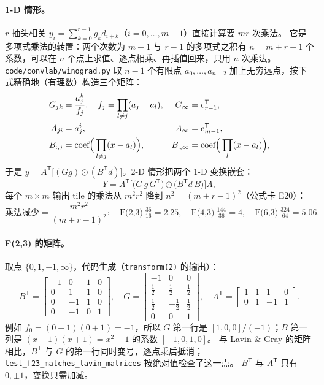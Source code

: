 \documentclass[11pt,a4paper]{ctexart}
\begin{document}
\paragraph{1-D 情形。} $r$ 抽头相关 $y_i = \sum_{k=0}^{r-1} g_k d_{i+k}$（$i = 0,\dots,m-1$）直接计算要 $mr$ 次乘法。
它是多项式乘法的转置：两个次数为 $m-1$ 与 $r-1$ 的多项式之积有 $n = m+r-1$ 个系数，可以在 $n$ 个点上求值、逐点相乘、再插值回来，只用 $n$ 次乘法。
\texttt{code/convlab/winograd.py} 取 $n-1$ 个有限点 $a_0,\dots,a_{n-2}$ 加上无穷远点，按下式精确地（有理数）构造三个矩阵：
\begin{align}
  G_{jk} &= \frac{a_j^k}{f_j},\quad f_j = \prod_{l\neq j}(a_j-a_l), & G_{\infty} &= e_{r-1}^{\mathsf T}, \notag\\
  A_{ji} &= a_j^i, & A_{\infty} &= e_{m-1}^{\mathsf T}, \label{eq:toomcook}\\
  B_{:,j} &= \text{coef}\Big(\prod_{l\neq j}(x-a_l)\Big), & B_{:,\infty} &= \text{coef}\Big(\prod_{l}(x-a_l)\Big), \notag
\end{align}
于是 $y = A^{\mathsf T}\big[(Gg)\odot(B^{\mathsf T}d)\big]$。2-D 情形把两个 1-D 变换嵌套：
\begin{equation}
  Y = A^{\mathsf T}\Big[\big(G\,g\,G^{\mathsf T}\big)\odot\big(B^{\mathsf T} d\,B\big)\Big]A,\label{eq:wino2d}
\end{equation}
每个 $m\times m$ 输出 tile 的乘法从 $m^2r^2$ 降到 $n^2 = (m+r-1)^2$（公式卡 E20）：
\begin{equation}
  \text{乘法减少} = \frac{m^2r^2}{(m+r-1)^2}:\quad \text{F(2,3)}\ \tfrac{36}{16}=2.25,\quad \text{F(4,3)}\ \tfrac{144}{36}=4,\quad \text{F(6,3)}\ \tfrac{324}{64}=5.06.\label{eq:reduction}
\end{equation}

\paragraph{F(2,3) 的矩阵。} 取点 $\{0,1,-1,\infty\}$，代码生成（\texttt{transform(2)} 的输出）：
\[
B^{\mathsf T} = \begin{bmatrix} -1 & 0 & 1 & 0\\ 0 & 1 & 1 & 0\\ 0 & -1 & 1 & 0\\ 0 & -1 & 0 & 1\end{bmatrix},\quad
G = \begin{bmatrix} -1 & 0 & 0\\ \tfrac12 & \tfrac12 & \tfrac12\\ \tfrac12 & -\tfrac12 & \tfrac12\\ 0 & 0 & 1\end{bmatrix},\quad
A^{\mathsf T} = \begin{bmatrix} 1 & 1 & 1 & 0\\ 0 & 1 & -1 & 1\end{bmatrix}.
\]
例如 $f_0 = (0-1)(0+1) = -1$，所以 $G$ 第一行是 $[1,0,0]/(-1)$；$B$ 第一列是 $(x-1)(x+1) = x^2-1$ 的系数 $[-1,0,1,0]$。
与 Lavin \& Gray 的矩阵相比，$B^{\mathsf T}$ 与 $G$ 的第一行同时变号，逐点乘后抵消；\texttt{test\_f23\_matches\_lavin\_matrices} 按绝对值检查了这一点。
$B^{\mathsf T}$ 与 $A^{\mathsf T}$ 只有 $0,\pm1$，变换只需加减。
\end{document}
